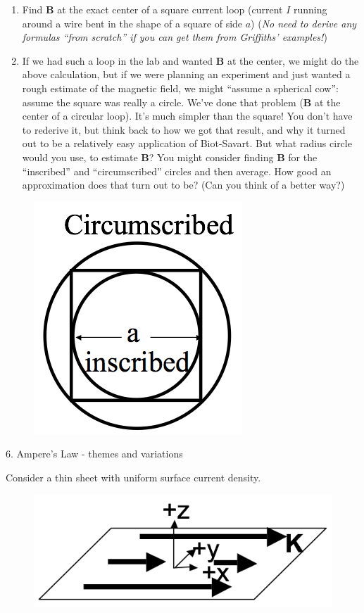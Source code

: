 \documentclass[11pt]{article}
\def\tightlist{}
\begin{document}
\begin{enumerate}
\def\labelenumi{\arabic{enumi}.}
\tightlist
\item
  Find \(\mathbf{B}\) at the exact center of a square current loop
  (current \(I\) running around a wire bent in the shape of a square of
  side \(a\)) (\emph{No need to derive any formulas ``from scratch'' if
  you can get them from Griffiths' examples!})
\item
  If we had such a loop in the lab and wanted \(\mathbf{B}\) at the
  center, we might do the above calculation, but if we were planning an
  experiment and just wanted a rough estimate of the magnetic field, we
  might ``assume a spherical cow'': assume the square was really a
  circle. We've done that problem (\(\mathbf{B}\) at the center of a
  circular loop). It's much simpler than the square! You don't have to
  rederive it, but think back to how we got that result, and why it
  turned out to be a relatively easy application of Biot-Savart. But
  what radius circle would you use, to estimate \(\mathbf{B}\)? You
  might consider finding \(\mathbf{B}\) for the ``inscribed'' and
  ``circumscribed'' circles and then average. How good an approximation
  does that turn out to be? (Can you think of a better way?)
\end{enumerate}

\begin{figure}[htbp]
\centering
\includegraphics[width=0.3\linewidth]{./images/hw9/square_wire.png}
\end{figure}

{\Large 6. Ampere's Law - themes and
variations}\label{amperes-law---themes-and-variations}

Consider a thin sheet with uniform surface current density.

\begin{figure}[htbp]
\centering
\includegraphics[width=0.5\linewidth]{./images/hw9/sheet_current.png}
\end{figure}
\end{document}
